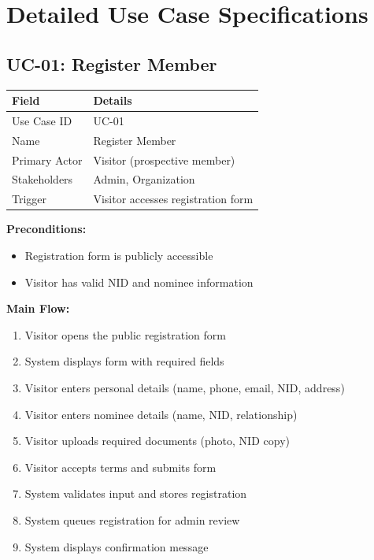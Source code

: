 \documentclass[11pt,a4paper]{article}
\begin{document}
\section{Detailed Use Case Specifications}

\subsection{UC-01: Register Member}

\begin{tabular}{@{}p{3.5cm}p{9.5cm}@{}}
\toprule
\textbf{Field} & \textbf{Details} \\
\midrule
Use Case ID & UC-01 \\
Name & Register Member \\
Primary Actor & Visitor (prospective member) \\
Stakeholders & Admin, Organization \\
Trigger & Visitor accesses registration form \\
\bottomrule
\end{tabular}

\vspace{0.5em}
\textbf{Preconditions:}
\begin{itemize}
    \item Registration form is publicly accessible
    \item Visitor has valid NID and nominee information
\end{itemize}

\textbf{Main Flow:}
\begin{enumerate}
    \item Visitor opens the public registration form
    \item System displays form with required fields
    \item Visitor enters personal details (name, phone, email, NID, address)
    \item Visitor enters nominee details (name, NID, relationship)
    \item Visitor uploads required documents (photo, NID copy)
    \item Visitor accepts terms and submits form
    \item System validates input and stores registration
    \item System queues registration for admin review
    \item System displays confirmation message
\end{enumerate}
\end{document}
